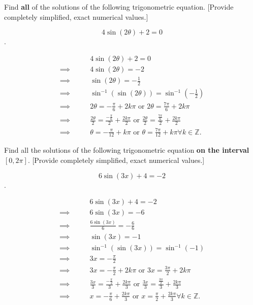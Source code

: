 \newpage

\begin{problem}
  Find \textbf{all} of the solutions of the following trigonometric equation.
  [Provide completely simplified, exact numerical values.]

  \[ 4\sin(2\theta) + 2 = 0 \].
\end{problem}

\begin{solution}
  \begin{align*} 
    &\qquad 4\sin(2\theta) + 2 = 0 \\
    \implies&\qquad 4\sin(2\theta) = -2 \\
    \implies&\qquad \sin(2\theta) = -\frac{1}{2} \\
    \implies&\qquad \sin^{-1} (\sin(2\theta)) = \sin^{-1} \left(-\frac{1}{2}\right) \\
    \implies&\qquad 2\theta = -\frac{\pi}{6} + 2k\pi \textrm{ or } 2\theta = \frac{7\pi}{6} + 2k\pi \\
    \implies&\qquad \frac{2\theta}{2} = \frac{-\frac{\pi}{6}}{2} + \frac{2k\pi}{2} \textrm{ or } \frac{2\theta}{2} = \frac{\frac{7\pi}{6}}{2} + \frac{2k\pi}{2} \\
    \implies&\qquad \theta = -\frac{\pi}{12} + k\pi \textrm{ or } \theta = \frac{7\pi}{12} + k\pi \forall k \in \mathbb{Z}
  .\end{align*}
\end{solution}

\newpage

\begin{problem}
  Find all the solutions of the following trigonometric equation
  \textbf{on the interval $[0, 2\pi]$}. [Provide completely simplified, exact
  numerical values.]

  \[ 6\sin(3x) + 4 = -2 \].
\end{problem}

\begin{solution}
  \begin{align*}
    &\qquad 6\sin(3x) + 4 = -2 \\
    \implies&\qquad 6\sin(3x) = -6 \\
    \implies&\qquad \frac{6\sin(3x)}{6} = -\frac{6}{6} \\
    \implies&\qquad \sin(3x) = -1 \\
    \implies&\qquad \sin^{-1} (\sin(3x)) = \sin^{-1} (-1) \\
    \implies&\qquad 3x = -\frac{\pi}{2} \\
    \implies&\qquad 3x = -\frac{\pi}{2} + 2k\pi \textrm{ or } 3x = \frac{3\pi}{2} + 2k\pi \\
    \implies&\qquad \frac{3x}{3} = \frac{-\frac{\pi}{2}}{3} + \frac{2k\pi}{3} \textrm{ or } \frac{3x}{3} = \frac{\frac{3\pi}{2}}{3} + \frac{2k\pi}{3} \\
    \implies&\qquad x = -\frac{\pi}{6} + \frac{2k\pi}{3} \textrm{ or } x = \frac{\pi}{2} + \frac{2k\pi}{3} \forall k \in \mathbb{Z}
  .\end{align*}
\end{solution}
